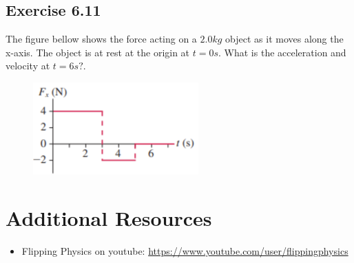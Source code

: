 \documentclass[11pt]{article}
\newenvironment{exercise}{
    \begin{mdframed}[style=problemstyle]\textcolor{black}{}
}{
    \end{mdframed}
}
\begin{document}
\subsection*{Exercise 6.11}
\begin{exercise}
    The figure bellow shows the force acting on a $2.0kg$ object as it moves
    along the x-axis. The object is at rest at the origin at $t=0s$. What 
    is the acceleration and velocity at $t=6s?$.
\end{exercise}
\begin{figure}[ht!]
    \centering
    \includegraphics[width=2.5in]{images/figure6_11.png}
\end{figure}


\section*{Additional Resources}
\begin{itemize}
    \item Flipping Physics on youtube: 
        \url{https://www.youtube.com/user/flippingphysics} 
\end{itemize}
\end{document}
